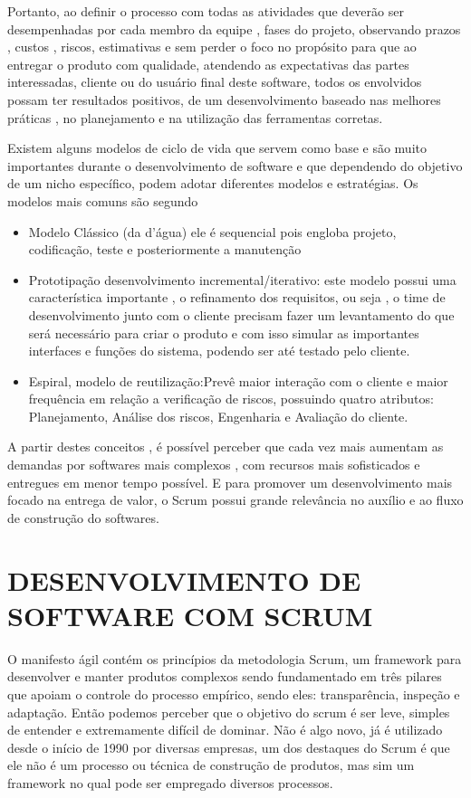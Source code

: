\documentclass[
	12pt,				%
	oneside,			%
	a4paper,			%
  section=TITLE,
	brazil,				%
	]{abntex2}
\begin{document}
Portanto, ao definir o processo com todas as atividades que deverão ser
desempenhadas por cada membro da equipe , fases do projeto, observando prazos ,
custos , riscos, estimativas e sem perder o foco no propósito para que ao
entregar o produto com qualidade, atendendo as expectativas das partes
interessadas, cliente ou do usuário final deste software, todos os envolvidos
possam ter resultados positivos, de um desenvolvimento baseado nas melhores
práticas , no planejamento e na utilização das ferramentas corretas.

Existem alguns modelos de ciclo de vida que servem como base e são muito
importantes durante o desenvolvimento de software e que dependendo do objetivo de um nicho
específico, podem adotar diferentes modelos e estratégias. Os modelos mais comuns são
segundo \cite{abran2001guide}

\begin{itemize}
  \item{Modelo Clássico (da d’água)} ele é sequencial pois engloba projeto,
    codificação, teste e posteriormente a manutenção
  \item{Prototipação} desenvolvimento incremental/iterativo: este modelo possui
uma característica importante , o refinamento dos requisitos, ou seja , o time de
desenvolvimento junto com o cliente precisam fazer um levantamento do que será
necessário para criar o produto e com isso simular as importantes interfaces e funções
do sistema, podendo ser até testado pelo cliente.
  \item{Espiral, modelo de reutilização:Prevê maior interação com o cliente e
maior frequência em relação a verificação de riscos, possuindo quatro atributos:
Planejamento, Análise dos riscos, Engenharia e Avaliação do cliente.}
\end{itemize}

A partir destes conceitos , é possível perceber que cada vez mais aumentam
as demandas por softwares mais complexos , com recursos mais sofisticados e entregues
em menor tempo possível. E para promover um desenvolvimento mais focado na
entrega de valor, o Scrum possui grande relevância no auxílio e ao fluxo de construção
do softwares.

\section{DESENVOLVIMENTO DE SOFTWARE COM SCRUM}

O manifesto ágil contém os princípios da metodologia Scrum, um framework para
desenvolver e manter produtos complexos sendo fundamentado em três pilares que
apoiam o controle do processo empírico, sendo eles: transparência, inspeção e
adaptação. Então podemos perceber que o objetivo do scrum é ser leve, simples
de entender e extremamente difícil de dominar. Não é algo novo, já é utilizado
desde o início de 1990 por diversas empresas, um dos destaques do Scrum é que
ele não é um processo ou técnica de construção de produtos, mas sim um
framework no qual pode ser empregado diversos processos.
\end{document}

